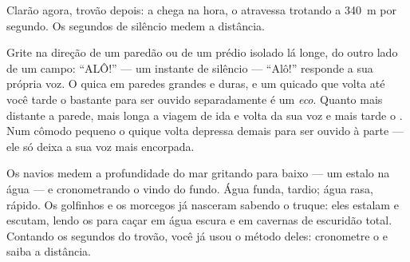 \begin{omfigure}

{\small Clarão agora, trovão depois: a  chega na hora, o 
atravessa trotando a \qty{340}{m} por segundo. Os segundos de
silêncio medem a distância.}
\end{omfigure}

\begin{example}[Ecos]\label{ex:g4:how-sound-travels:echo}
Grite na direção de um paredão ou de um prédio isolado lá longe, do
outro lado de um campo: ``ALÔ!'' --- um instante de silêncio ---
``Alô!'' responde a sua própria voz. O  quica em paredes grandes e
duras, e um  quicado que volta até você tarde o bastante para ser
ouvido separadamente é um \emph{eco}. Quanto mais distante
a parede, mais longa a viagem de ida e volta da sua voz e mais tarde
o . Num cômodo pequeno o quique volta depressa demais para ser
ouvido à parte --- ele só deixa a sua voz mais encorpada.
\end{example}

\begin{remark}\label{rem:g4:how-sound-travels:sonar}
Os navios medem a profundidade do mar gritando para baixo --- um
estalo na água --- e cronometrando o  vindo do fundo. Água funda,
 tardio; água rasa,  rápido. Os golfinhos e os morcegos já
nasceram sabendo o truque: eles estalam e escutam, lendo os  para
caçar em água escura e em cavernas de escuridão total. Contando os
segundos do trovão, você já usou o método deles: cronometre o  e
saiba a distância.
\end{remark}

